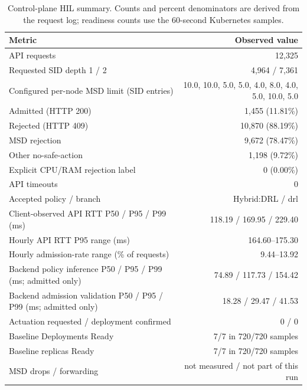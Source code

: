 \documentclass[final,5p]{elsarticle}
\newcommand{\rev}[1]{\textcolor{revisiongreen}{#1}}
\let\newrev\rev
\begin{document}
\begin{table}[t]
\centering
\caption{\newrev{Control-plane HIL summary. Counts and percent denominators are derived from the request log; readiness counts use the 60-second Kubernetes samples.}}
\label{tab:hil_12h}
{\color{revisiongreen}
\small
\begin{tabular}{@{}lr@{}}
\toprule
Metric & Observed value \\
\midrule
API requests & 12,325 \\
Requested SID depth 1 / 2 & 4,964 / 7,361 \\
Configured per-node MSD limit (SID entries) & 10.0, 10.0, 5.0, 5.0, 4.0, 8.0, 4.0, 5.0, 10.0, 5.0 \\
Admitted (HTTP 200) & 1,455 (11.81\%) \\
Rejected (HTTP 409) & 10,870 (88.19\%) \\
\quad MSD rejection & 9,672 (78.47\%) \\
\quad Other no-safe-action & 1,198 (9.72\%) \\
\quad Explicit CPU/RAM rejection label & 0 (0.00\%) \\
API timeouts & 0 \\
Accepted policy / branch & Hybrid:DRL / drl \\
Client-observed API RTT P50 / P95 / P99 (ms) & 118.19 / 169.95 / 229.40 \\
Hourly API RTT P95 range (ms) & 164.60--175.30 \\
Hourly admission-rate range (\% of requests) & 9.44--13.92 \\
Backend policy inference P50 / P95 / P99 (ms; admitted only) & 74.89 / 117.73 / 154.42 \\
Backend admission validation P50 / P95 / P99 (ms; admitted only) & 18.28 / 29.47 / 41.53 \\
Actuation requested / deployment confirmed & 0 / 0 \\
Baseline Deployments Ready & 7/7 in 720/720 samples \\
Baseline replicas Ready & 7/7 in 720/720 samples \\
MSD drops / forwarding & not measured / not part of this run \\
\bottomrule
\end{tabular}

}
\end{table}
\end{document}
